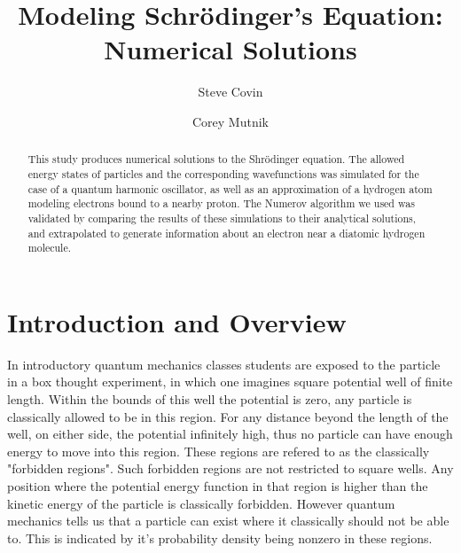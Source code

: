 \documentclass[aps,prl,twocolumn,superscriptaddress]{revtex4-1}
\begin{document}
\title{Modeling Schr\"{o}dinger's Equation: \\
Numerical Solutions}


\author{Steve Covin}
\author{Corey Mutnik}



\begin{abstract}
This study produces numerical solutions to the Shr\"{o}dinger equation. The allowed energy states of particles and the corresponding wavefunctions was simulated for the case of a quantum harmonic oscillator, as well as an approximation of a hydrogen atom modeling electrons bound to a nearby proton. The Numerov algorithm we used was validated by comparing the results of these simulations to their analytical solutions, and extrapolated to generate information about an electron near a diatomic hydrogen molecule. 

\end{abstract}

\maketitle    


\section{Introduction and Overview}

In introductory quantum mechanics classes students are 
exposed to the particle in a box thought experiment, in which  
one imagines square potential well of finite length.  Within the bounds of 
this well the potential is zero, any particle is classically allowed to be in this region.  For any distance beyond the 
length of the well, on either side, the potential infinitely high, thus no particle can have enough energy to move into this region.  These regions are refered to as the classically "forbidden regions".
Such forbidden regions are not restricted to square wells.  Any position where the potential energy function in that region is higher than the kinetic energy of the particle is classically forbidden. However quantum mechanics tells us that a particle can 
exist where it classically should not be able to.  This is indicated by it's probability 
density being nonzero in these regions.
\end{document}
